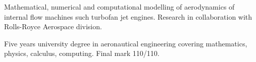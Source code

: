 
Mathematical, numerical and computational modelling of aerodynamics of internal flow machines such
turbofan jet engines. Research in collaboration with Rolls-Royce Aerospace division.

%
Five years university degree in aeronautical engineering covering mathematics, physics, calculus, computing. Final mark 110/110.
